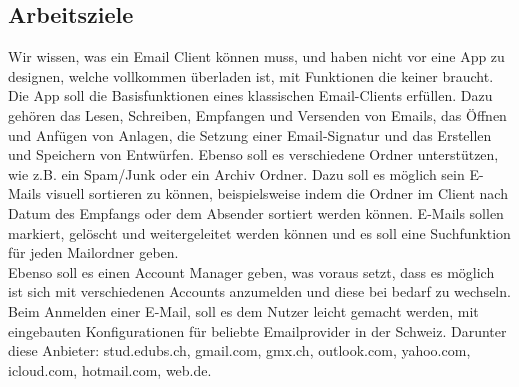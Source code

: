 \documentclass[a4paper,11pt]{article}
\begin{document}

\subsection{Arbeitsziele}

Wir wissen, was ein Email Client können muss, und haben nicht vor eine App zu designen, welche vollkommen überladen ist, mit Funktionen die keiner braucht.\\

Die App soll die Basisfunktionen eines klassischen Email-Clients erfüllen. Dazu gehören das Lesen, Schreiben, Empfangen und Versenden von Emails, 
das Öffnen und Anfügen von Anlagen, die Setzung einer Email-Signatur und das Erstellen und Speichern von Entwürfen. 
Ebenso soll es verschiedene Ordner unterstützen, wie z.B. ein Spam/Junk oder ein Archiv Ordner. 
Dazu soll es möglich sein E-Mails visuell sortieren zu können, beispielsweise indem die Ordner im Client nach Datum des Empfangs oder dem Absender sortiert werden können. E-Mails sollen markiert, gelöscht und weitergeleitet werden können und es soll eine Suchfunktion für jeden Mailordner geben. \\

Ebenso soll es einen Account Manager geben, was voraus setzt, dass es möglich ist sich mit verschiedenen 
Accounts anzumelden und diese bei bedarf zu wechseln. Beim Anmelden einer E-Mail, soll es dem Nutzer leicht gemacht werden, mit eingebauten Konfigurationen für beliebte 
Emailprovider in der Schweiz. Darunter diese Anbieter: stud.edubs.ch, gmail.com, gmx.ch, outlook.com, yahoo.com, icloud.com, hotmail.com, web.de. \\
\end{document}
